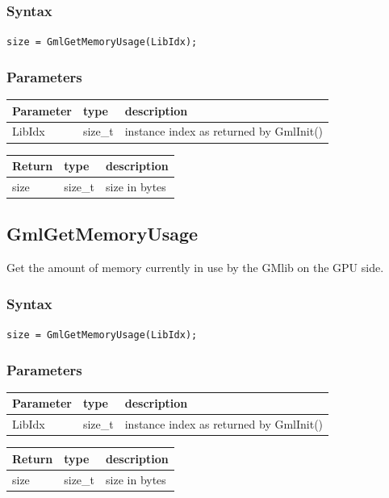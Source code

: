\documentclass[a4paper,12pt]{article}
\begin{document}
\subsubsection*{Syntax}
{\tt size = GmlGetMemoryUsage(LibIdx);}

\subsubsection*{Parameters}

\begin{tabular}{|m{2cm}|m{1.5cm}|m{10.5cm}|}
\hline
Parameter  & type    & description \\
\hline
LibIdx     & size\_t & instance index as returned by GmlInit() \\
\hline
\end{tabular}

\medskip

\begin{tabular}{|m{2cm}|m{1.5cm}|m{10.5cm}|}
\hline
Return     & type    & description \\
\hline
size       & size\_t & size in bytes \\
\hline
\end{tabular}


\subsection{GmlGetMemoryUsage}
Get the amount of memory currently in use by the GMlib on the GPU side.

\subsubsection*{Syntax}
{\tt size = GmlGetMemoryUsage(LibIdx);}

\subsubsection*{Parameters}
\begin{tabular}{|m{2cm}|m{1.5cm}|m{10.5cm}|}
\hline
Parameter  & type    & description \\
\hline
LibIdx     & size\_t & instance index as returned by GmlInit() \\
\hline
\end{tabular}

\medskip

\begin{tabular}{|m{2cm}|m{1.5cm}|m{10.5cm}|}
\hline
Return     & type    & description \\
\hline
size       & size\_t & size in bytes \\
\hline
\end{tabular}
\end{document}

